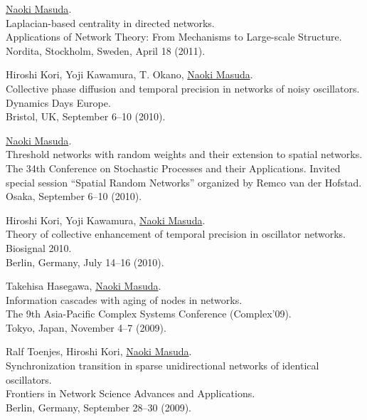 \documentclass[11pt,letter]{article}
\begin{document}
\begin{etaremune}
\item \underline{Naoki Masuda}.\\
Laplacian-based centrality in directed networks.\\
Applications of Network Theory: From Mechanisms to Large-scale Structure.\\
Nordita, Stockholm, Sweden, April 18 (2011).

\item Hiroshi Kori, Yoji Kawamura, T. Okano, \underline{Naoki Masuda}.\\
Collective phase diffusion and temporal precision in networks of noisy oscillators.\\
Dynamics Days Europe.\\
Bristol, UK, September 6--10 (2010).

\item \underline{Naoki Masuda}.\\
Threshold networks with random weights and their extension to spatial networks.\\
The 34th Conference on Stochastic Processes and their Applications. Invited special session ``Spatial Random Networks'' organized by Remco van der Hofstad.\\
Osaka, September 6--10 (2010).

\item Hiroshi Kori, Yoji Kawamura, \underline{Naoki Masuda}.\\
Theory of collective enhancement of temporal precision in oscillator networks.\\
Biosignal 2010.\\
Berlin, Germany, July 14--16 (2010).

\item Takehisa Hasegawa, \underline{Naoki Masuda}.\\
Information cascades with aging of nodes in networks.\\
The 9th Asia-Pacific Complex Systems Conference (Complex'09).\\
Tokyo, Japan, November 4--7 (2009).

\item Ralf Toenjes, Hiroshi Kori, \underline{Naoki Masuda}.\\
Synchronization transition in sparse unidirectional networks of identical oscillators.\\
Frontiers in Network Science Advances and Applications.\\
Berlin, Germany, September 28--30 (2009).


\end{etaremune}
\end{document}
